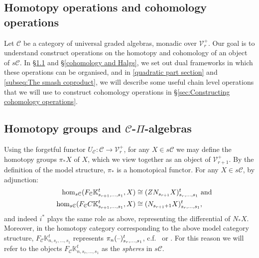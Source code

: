 \documentclass[11pt]{amsart}
\theoremstyle{plain}
\theoremstyle{definition}
\newcommand{\DASH}{\textup{--}}
\renewcommand{\to}{\longrightarrow}
\newcommand{\calC}{\mathcal{C}}
\newcommand{\calV}{\mathcal{V}}
\newcommand{\calc}{\mathcal{C}}
\theoremstyle{plain}
\newcommand{\vect}[2]{\calV^{#1}_{#2}}
\begin{document}
\begin{CPiAlgs and CHalgs}

\section{\textbf{Homotopy operations and cohomology operations}}
Let $\calC$ be a category of universal graded algebras, monadic over $\vect{+}{r}$. Our goal is to understand construct operations on the homotopy and cohomology of an object of $s\calC$. In \S\ref{homotopy and pialgs} and \S\ref{cohomology and Halgs}, we set out dual frameworks in which these operations can be organised, and in \ref{quadratic part section} and \ref{subseq:The smash coproduct}, we will describe some useful chain level operations that we will use to construct cohomology operations in \S\ref{sec:Constructing cohomology operations}.


\subsection{Homotopy groups and $\calC$-$\Pi$-algebras}\label{homotopy and pialgs}
Using the forgetful functor $U_\calC:\calc\to \vect{+}{r}$, for any $X\in s\calc$ we may define the homotopy groups $\pi_*X$ of $X$,
which we view together as an object  of $\vect{+}{r+1}$. By the definition of the model structure, $\pi_*$ is a homotopical functor.
For any $X\in s\calC$, by adjunction:
\begin{alignat*}{2}
\hom_{s\calC}(F_\calC\mathbb{K}^t_{s_{r+1},\ldots,s_1},X)&\cong (ZN_{s_{r+1}}X)_{s_r,\ldots,s_1}^t\makebox[0cm][l]{ and}\\
\hom_{s\calC}(F_{\calC}C\mathbb{K}^t_{s_{r+1},\ldots,s_1},X)&\cong (N_{s_{r+1}+1}X)_{s_r,\ldots,s_1}^t,
\end{alignat*}
and indeed $i^*$ plays the same role as above, representing the differential of $N_*X$. Moreover, in the homotopy category corresponding to the above model category structure, $F_\calC\mathbb{K}^t_{n,s_r,\ldots,s_1}$ represents $\pi_n(\DASH)^t_{s_r,\ldots,s_1}$, c.f.\ \cite[\S1]{MR1089001} or \cite[\S3.1.1]{Blanc_Stover-Groth_SS.pdf}. For this reason we will refer to the objects $F_\calC\mathbb{K}^t_{n,s_r,\ldots,s_1}$ as the \emph{spheres} in $s\calC$.


\end{CPiAlgs and CHalgs}
\end{document}
